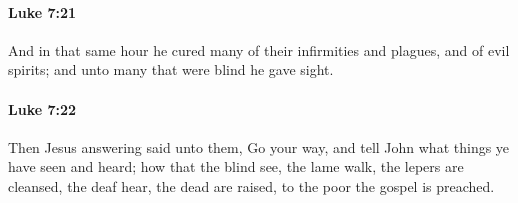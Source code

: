 		\paragraph{Luke 7:21} %
			\label{LUKE-7-21}

			And in that same hour he cured many of their infirmities and plagues, and of evil spirits; and unto many that were blind he gave sight.

			\begin{framed}
			\scriptsize
				\begin{compactdesc}
					\item[SBLG] 
				\end{compactdesc}
			\end{framed}

		\paragraph{Luke 7:22} %
			\label{LUKE-7-22}

			Then Jesus answering said unto them, Go your way, and tell John what things ye have seen and heard; how that the blind see, the lame walk, the lepers are cleansed, the deaf hear, the dead are raised, to the poor the gospel is preached.

